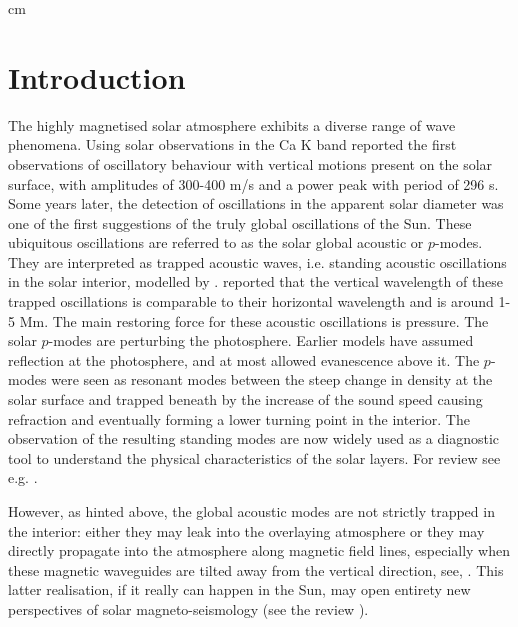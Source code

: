 \documentclass[preprint,authoryear,12pt]{elsarticle}
\begin{document}
 cm

\section{Introduction}
The highly magnetised solar atmosphere exhibits a diverse range of wave phenomena. Using solar observations in the Ca K band \citet{Leighton1960} reported the first observations of oscillatory behaviour with vertical motions present on the solar surface, with amplitudes of 300-400 m/s and a power peak with period of 296 s. Some years later, the detection of oscillations in the apparent solar diameter \citep[see e.g][]{Hill1976, Brown1978} was one of the first suggestions of the truly global oscillations of the Sun. These ubiquitous oscillations are referred to as the solar global acoustic or $p$-modes.  They are interpreted as trapped acoustic waves, i.e. standing acoustic oscillations in the solar interior, modelled by \citet{Ulrich1970}. \citet{Leibacher1971} reported that the vertical wavelength of these trapped oscillations is comparable to their horizontal wavelength and is around 1-5 Mm. The main restoring force for these acoustic oscillations is pressure. The solar $p$-modes are perturbing the photosphere. Earlier models have assumed reflection at the photosphere, and at most allowed evanescence above it. The $p$-modes were seen as resonant modes between the steep change in density at the solar surface and trapped beneath by the increase of the sound speed causing refraction and eventually forming a lower turning point in the interior. The observation of the resulting standing modes are now widely used as a diagnostic tool to understand the physical characteristics of the  solar layers. For review see e.g. \citet{Christensen-Dalsgaard2002,Erdelyi2006A, Erdelyi2006B,Thompson2006,Pinter2011}.   

However, as hinted above, the global acoustic modes are not strictly trapped in the interior: either they may leak into the overlaying atmosphere or they may directly propagate into the atmosphere along magnetic field lines, especially when these magnetic waveguides are tilted away from the vertical direction, see, \citet{DePontieu2003A, DePontieu2003B,DePontieu2005}. This latter realisation, if it really can happen in the Sun, may open entirety new perspectives of solar magneto-seismology (see the review \citet{DePontieu2006}).  
\end{document}
